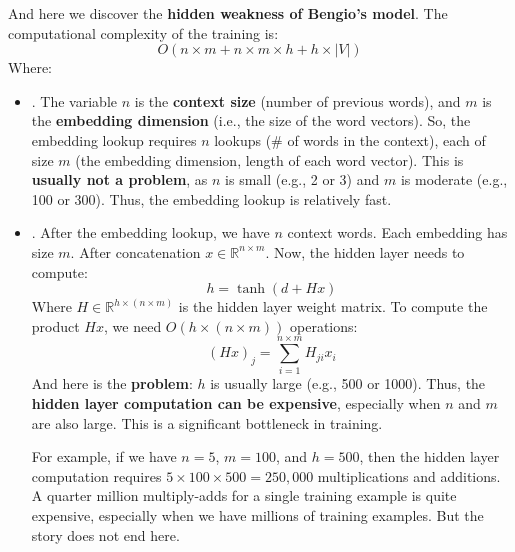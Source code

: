 \highspace
And here we discover the \textbf{hidden weakness of Bengio's model}. The computational complexity of the training is:
\begin{equation}
    O\left(n \times m + n \times m \times h + h \times \left|V\right|\right)
\end{equation}
Where:
\begin{itemize}
    \item {}. The variable $n$ is the \textbf{context size} (number of previous words), and $m$ is the \textbf{embedding dimension} (i.e., the size of the word vectors). So, the embedding lookup requires $n$ lookups (\# of words in the context), each of size $m$ (the embedding dimension, length of each word vector). This is \textbf{usually not a problem}, as $n$ is small (e.g., 2 or 3) and $m$ is moderate (e.g., 100 or 300). Thus, the embedding lookup is relatively fast.


    \item {}. After the embedding lookup, we have $n$ context words. Each embedding has size $m$. After concatenation $x \in \mathbb{R}^{n \times m}$. Now, the hidden layer needs to compute:
    \begin{equation*}
        h = \tanh\left(d + Hx\right)
    \end{equation*}
    Where $H \in \mathbb{R}^{h \times (n \times m)}$ is the hidden layer weight matrix. To compute the product $Hx$, we need $O\left(h \times (n \times m)\right)$ operations:
    \begin{equation*}
        \left(Hx\right)_{j} = \sum_{i=1}^{n \times m} H_{ji} x_i
    \end{equation*}
    And here is the \textbf{problem}: $h$ is usually large (e.g., 500 or 1000). Thus, the \textbf{hidden layer computation can be expensive}, especially when $n$ and $m$ are also large. This is a significant bottleneck in training.

    For example, if we have $n = 5$, $m = 100$, and $h = 500$, then the hidden layer computation requires $5 \times 100 \times 500 = 250,000$ multiplications and additions. A quarter million multiply-adds for a single training example is quite expensive, especially when we have millions of training examples. But the story does not end here.   



\end{itemize}
